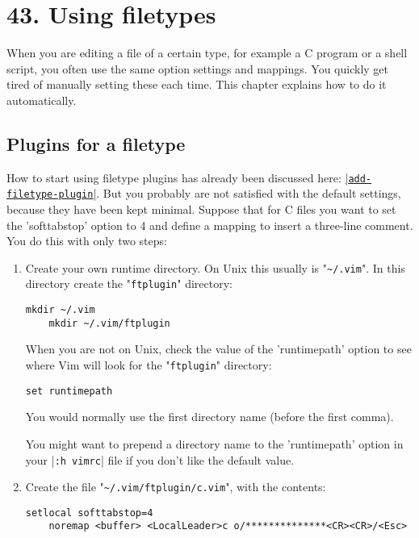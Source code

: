 \section{43. Using filetypes}
When you are editing a file of a certain type, for example a C program or a shell script, you often use the same option settings and mappings.
You quickly get tired of manually setting these each time.
This chapter explains how to do it automatically.
\subsection{Plugins for a filetype}            
\label{filetype-plugin}
How to start using filetype plugins has already been discussed here: \hyperref[add-filetype-plugin]{|\texttt{add-filetype-plugin}|}.
But you probably are not satisfied with the default settings, because they have been kept minimal.
Suppose that for C files you want to set the 'softtabstop' option to 4 and define a mapping to insert a three-line comment.
You do this with only two steps:

\label{your-runtime-dir}
\begin{enumerate}
				\item Create your own runtime directory.
								On Unix this usually is "\verb!~/.vim!".
								In this directory create the "\verb!ftplugin!" directory:

								\begin{Verbatim}[samepage=true]
	mkdir ~/.vim
	mkdir ~/.vim/ftplugin
								\end{Verbatim}


								When you are not on Unix, check the value of the 'runtimepath' option to see where Vim will look for the "\verb!ftplugin!" directory:

								\begin{Verbatim}[samepage=true]
 set runtimepath
								\end{Verbatim}

								You would normally use the first directory name (before the first comma).

								You might want to prepend a directory name to the 'runtimepath' option in your |\verb!:h vimrc!| file if you don't like the default value.

				\item Create the file "\verb!~/.vim/ftplugin/c.vim!", with the contents:
								\begin{Verbatim}[samepage=true]
	setlocal softtabstop=4
	noremap <buffer> <LocalLeader>c o/**************<CR><CR>/<Esc>
								\end{Verbatim}
\end{enumerate}

